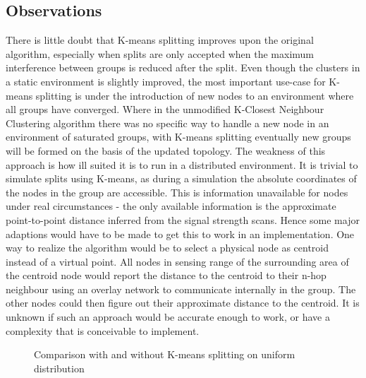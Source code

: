\subsection{Observations}
There is little doubt that K-means splitting improves upon the original algorithm, especially when splits are only accepted when the maximum interference between groups is reduced after the split.
Even though the clusters in a static environment is slightly improved, the most important use-case for K-means splitting is under the introduction of new nodes to an environment
where all groups have converged. Where in the unmodified K-Closest Neighbour Clustering algorithm there was no specific way to handle a new node in an environment of saturated groups,
with K-means splitting eventually new groups will be formed on the basis of the updated topology. The weakness of this approach is how ill suited it is to run in a distributed environment.
It is trivial to simulate splits using K-means, as during a simulation the absolute coordinates of the nodes in the group are accessible. This is information unavailable for nodes under
real circumstances - the only available information is the approximate point-to-point distance inferred from the signal strength scans.
Hence some major adaptions would have to be made to get this to work in an implementation.
One way to realize the algorithm would be to select a physical node as centroid instead of a virtual point. All nodes in sensing range of the surrounding area of
the centroid node would report the distance to the centroid to their n-hop neighbour using an overlay network to communicate internally in the group. The other nodes could
then figure out their approximate distance to the centroid. It is unknown if such an approach would be accurate enough to work, or have a complexity that is conceivable to implement.  

\begin{figure}
	\centering
		\qquad
		\caption{Comparison with and without K-means splitting on uniform distribution}%
		\label{fig:kmeanscomparisonuniform}%
\end{figure}


